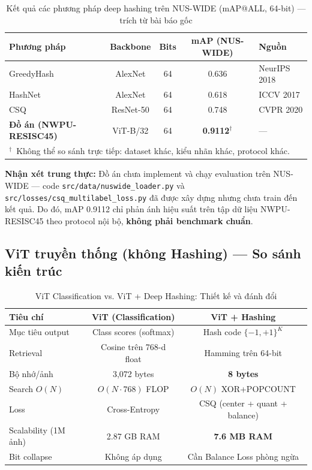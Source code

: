 \documentclass[13pt,a4paper]{article}
\begin{document}
\begin{table}[H]
\centering
\caption{Kết quả các phương pháp deep hashing trên NUS-WIDE (mAP@ALL, 64-bit) --- trích từ bài báo gốc}
\label{tab:sota_nuswide}
\begin{tabular}{lcccl}
\toprule
\textbf{Phương pháp} & \textbf{Backbone} & \textbf{Bits} & \textbf{mAP (NUS-WIDE)} & \textbf{Nguồn} \\
\midrule
GreedyHash \cite{su2018greedy}    & AlexNet   & 64 & 0.636 & NeurIPS 2018 \\
HashNet \cite{cao2017hashnet}      & AlexNet   & 64 & 0.618 & ICCV 2017 \\
CSQ \cite{yuan2020csq}             & ResNet-50 & 64 & 0.748 & CVPR 2020 \\
\midrule
\textbf{Đồ án (NWPU-RESISC45)}    & ViT-B/32  & 64 & \textbf{0.9112}$^\dagger$ & --- \\
\bottomrule
\multicolumn{5}{l}{\small $^\dagger$~Không thể so sánh trực tiếp: dataset khác, kiểu nhãn khác, protocol khác.}
\end{tabular}
\end{table}

\textbf{Nhận xét trung thực:} Đồ án chưa implement và chạy evaluation trên NUS-WIDE --- code \texttt{src/data/nuswide\_loader.py} và \texttt{src/losses/csq\_multilabel\_loss.py} đã được xây dựng nhưng chưa train đến kết quả. Do đó, mAP 0.9112 chỉ phản ánh hiệu suất trên tập dữ liệu NWPU-RESISC45 theo protocol nội bộ, \textbf{không phải benchmark chuẩn}.


\subsection{ViT truyền thống (không Hashing) --- So sánh kiến trúc}

\begin{table}[H]
\centering
\caption{ViT Classification vs. ViT + Deep Hashing: Thiết kế và đánh đổi}
\label{tab:vs_vit}
\begin{tabular}{lcc}
\toprule
\textbf{Tiêu chí} & \textbf{ViT (Classification)} & \textbf{ViT + Hashing} \\
\midrule
Mục tiêu output     & Class scores (softmax)    & Hash code $\{-1,+1\}^K$ \\
Retrieval           & Cosine trên 768-d float   & Hamming trên 64-bit \\
Bộ nhớ/ảnh          & 3{,}072 bytes             & \textbf{8 bytes} \\
Search $O(N)$       & $O(N \cdot 768)$ FLOP     & $O(N)$ XOR+POPCOUNT \\
Loss                & Cross-Entropy             & CSQ (center + quant + balance) \\
Scalability (1M ảnh)& 2.87 GB RAM               & \textbf{7.6 MB RAM} \\
Bit collapse        & Không áp dụng             & Cần Balance Loss phòng ngừa \\
\bottomrule
\end{tabular}
\end{table}
\end{document}
